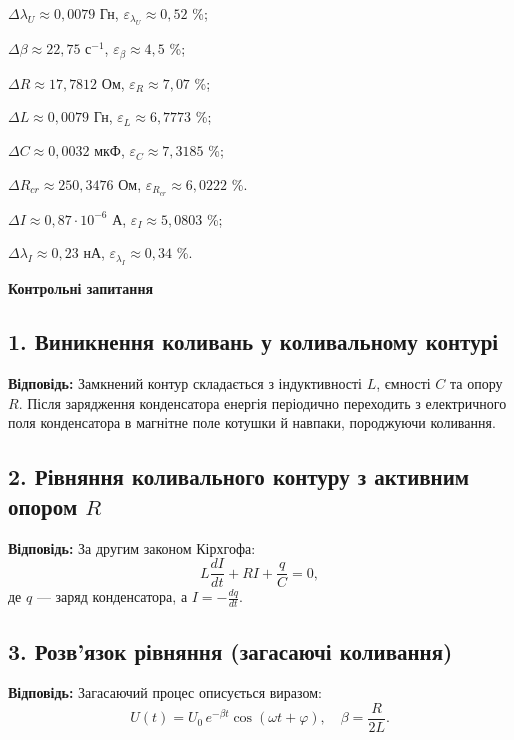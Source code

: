 \documentclass[12pt,a4paper]{article}
\begin{document}
    $\Delta \lambda_U \approx 0,0079$ Гн, $\varepsilon_{\lambda_U} \approx 0,52$ \%;

    $\Delta \beta \approx 22,75 \text{ с}^{-1}$, $\varepsilon_{\beta} \approx 4,5$ \%;

    $\Delta R \approx 17,7812$ Ом, $\varepsilon_R \approx 7,07$ \%;

    $\Delta L \approx 0,0079$ Гн, $\varepsilon_L \approx 6,7773$ \%;

    $\Delta C \approx 0,0032$ мкФ, $\varepsilon_C \approx 7,3185$ \%;

    $\Delta R_{cr} \approx 250,3476$ Ом, $\varepsilon_{R_{cr}} \approx 6,0222$ \%.

    $\Delta I \approx 0,87 \cdot 10^{-6}$ А, $\varepsilon_I \approx 5,0803$ \%;

    $\Delta \lambda_I \approx 0,23$ нА, $\varepsilon_{\lambda_I} \approx 0,34$ \%.

    \vspace{3em}

    \newpage

    \begin{center}
        \textbf{\Large Контрольні запитання}
    \end{center}

    \subsection*{1. Виникнення коливань у коливальному контурі}
    \textbf{Відповідь:}  
    Замкнений контур складається з індуктивності $L$, ємності $C$ та опору $R$. Після зарядження конденсатора енергія періодично переходить з електричного поля конденсатора в магнітне поле котушки й навпаки, породжуючи коливання.

    \subsection*{2. Рівняння коливального контуру з активним опором $R$}
    \textbf{Відповідь:}  
    За другим законом Кірхгофа:
    \[
    L\frac{dI}{dt} + RI + \frac{q}{C} = 0,
    \]
    де $q$ --- заряд конденсатора, а $I=-\frac{dq}{dt}$.

    \subsection*{3. Розв’язок рівняння (загасаючі коливання)}
    \textbf{Відповідь:}  
    Загасаючий процес описується виразом:
    \[
    U(t)=U_0\, e^{-\beta t}\cos(\omega t+\varphi),\quad \beta=\frac{R}{2L}.
    \]
\end{document}
